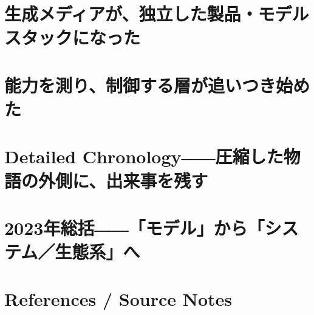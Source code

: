 \documentclass[lualatex,a4paper,11pt]{jlreq}
\begin{document}
\Needspace{0.45\textheight}
\bigskip
\section{生成メディアが、独立した製品・モデルスタックになった}
\label{pkg:generative-media}

\medskip
\begin{multicols}{2}

\end{multicols}


\Needspace{0.45\textheight}
\bigskip
\section{能力を測り、制御する層が追いつき始めた}
\label{pkg:evaluation-control}

\medskip
\begin{multicols}{2}

\end{multicols}


\Needspace{0.45\textheight}
\bigskip
\section{Detailed Chronology――圧縮した物語の外側に、出来事を残す}
\label{pkg:annual-chronology}

\medskip
\begin{multicols}{2}

\end{multicols}

\Needspace{0.45\textheight}
\bigskip
\section{2023年総括――「モデル」から「システム／生態系」へ}
\label{pkg:annual-synthesis}

\medskip
\begin{multicols}{2}

\end{multicols}

\Needspace{0.30\textheight}
\bigskip
{}\par
\smallskip
\section*{References / Source Notes}
\begingroup
\footnotesize
\setlength{\bibitemsep}{0pt}
\begin{multicols}{2}
\raggedright
\printbibliography[heading=none]
\end{multicols}
\endgroup
\end{document}
